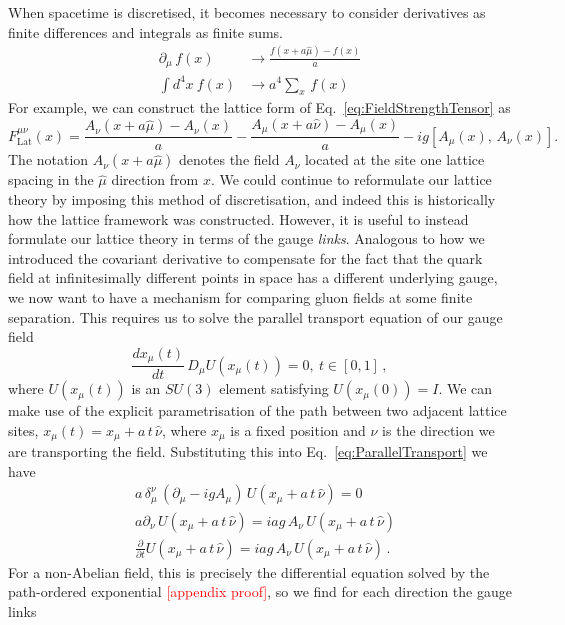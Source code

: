 When spacetime is discretised, it becomes necessary to consider derivatives as finite differences and integrals as finite sums.
\begin{align*}
\partial_\mu\,f(x)&\rightarrow \frac{f(x+a\hat{\mu})-f(x)}{a}\\
\int d^4x~f(x) &\rightarrow a^4\sum_x \,f(x)
\end{align*}
For example, we can construct the lattice form of Eq.~\ref{eq:FieldStrengthTensor} as
%
\begin{equation}
F_{\text{Lat}}^{\mu\nu}(x) = \frac{A_\nu(x+a\hat{\mu})-A_\nu(x)}{a}-\frac{A_\mu(x+a\hat{\nu})-A_\mu(x)}{a}-ig[A_\mu(x),\,A_\nu(x)].
\label{eq:DiscreteFST}
\end{equation}
%
The notation $A_\nu(x+a\hat{\mu})$ denotes the field $A_\nu$ located at the site one lattice spacing in the $\hat{\mu}$ direction from $x$. We could continue to reformulate our lattice theory by imposing this method of discretisation, and indeed this is historically how the lattice framework was constructed\cite{Wilson:1974sk}. However, it is useful to instead formulate our lattice theory in terms of the gauge {\it links}. Analogous to how we introduced the covariant derivative to compensate for the fact that the quark field at infinitesimally different points in space has a different underlying gauge, we now want to have a mechanism for comparing gluon fields at some finite separation. This requires us to solve the parallel transport equation of our gauge field~\cite{Bing:1999ee}
%
\begin{equation}
\frac{dx_\mu(t)}{dt}\,D_\mu U(x_\mu(t))=0,~t\in [0,1]\, ,
\label{eq:ParallelTransport}
\end{equation}
%
where $U(x_\mu(t))$ is an $SU(3)$ element satisfying $U(x_\mu(0))=I$. We can make use of the explicit parametrisation of the path between two adjacent lattice sites, $x_\mu(t) = x_\mu+a\,t\,\hat{\nu}$, where $x_\mu$ is a fixed position and $\nu$ is the direction we are transporting the field. Substituting this into Eq.~\ref{eq:ParallelTransport} we have
\begin{align*}
&a\,\delta^\nu_\mu\, (\partial_\mu-igA_\mu)\,U(x_\mu+a\,t\,\hat{\nu})=0\\
&a\partial_\nu\, U(x_\mu+a\,t\,\hat{\nu}) = iag\, A_\nu\,U(x_\mu+a\,t\,\hat{\nu})\\
&\frac{\partial}{\partial t}U(x_\mu+a\,t\,\hat{\nu}) = iag\,A_\nu\, U(x_\mu+a\,t\,\hat{\nu})\, .
\end{align*}
For a non-Abelian field, this is precisely the differential equation solved by the path-ordered exponential \textcolor{red}{[appendix proof]}, so we find for each direction the gauge links
